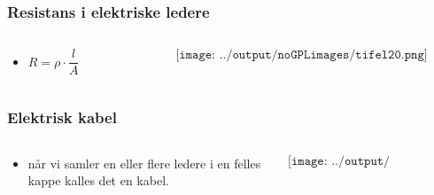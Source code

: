 \documentclass[aspectratio=169,xcolor=dvipsnames]{beamer}
\begin{document}
\begin{frame}
	\frametitle{Resistans i elektriske ledere}

	\begin{columns}
		\begin{column}{0.5\textwidth}
			\begin{itemize}
				\item $R=\rho \cdot \dfrac{l}{A}$
			\end{itemize}
		\end{column}

		\begin{column}{0.5\textwidth}
			$$\texttt{[image: ../output/noGPLimages/tifel20.png]}$$
		\end{column}
	\end{columns}
\end{frame}

\begin{frame}
	\frametitle{Elektrisk kabel}

	\begin{columns}
		\begin{column}{0.5\textwidth}
			\begin{itemize}
				\item når vi samler en eller flere ledere i en felles kappe kalles det en kabel. 
			\end{itemize}
		\end{column}

		\begin{column}{0.5\textwidth}
			$$\texttt{[image: ../output/noGPLimages/tifel21.png]}$$
		\end{column}
	\end{columns}
\end{frame}
\end{document}
